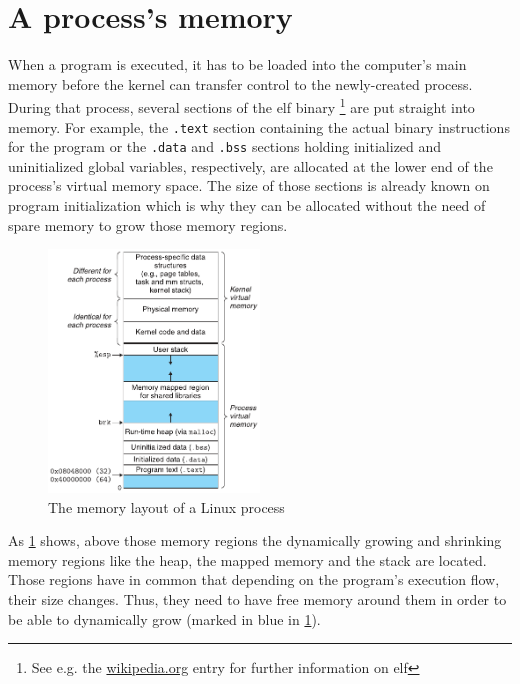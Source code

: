 \section{A process's memory}
\label{sec:process-memory}

When a program is executed, it has to be loaded into the computer's main memory before the kernel can transfer control to the newly-created process.
During that process, several sections of the \gls{elf} binary%
	\footnote{See e.g. the \href{https://en.wikipedia.org/wiki/Executable_and_Linkable_Format}{wikipedia.org} entry for further information on \gls{elf}}
are put straight into memory.
For example, the \texttt{.text} section containing the actual binary instructions for the program or the \texttt{.data} and \texttt{.bss} sections holding initialized and uninitialized global variables, respectively, are allocated at the lower end of the process's virtual memory space.
The size of those sections is already known on program initialization which is why they can be allocated without the need of spare memory to grow those memory regions.

\begin{figure}[htb]
	\centering
	\includegraphics[width=0.5\textwidth]{figures/memory-layout}
	\caption{The memory layout of a Linux process \cite[804]{Bryant2011}}
	\label{fig:memory-layout}
\end{figure}

As \cref{fig:memory-layout} shows, above those memory regions the dynamically growing and shrinking memory regions like the heap, the mapped memory and the stack are located.
Those regions have in common that depending on the program's execution flow, their size changes.
Thus, they need to have free memory around them in order to be able to dynamically grow (marked in blue in \cref{fig:memory-layout}).


